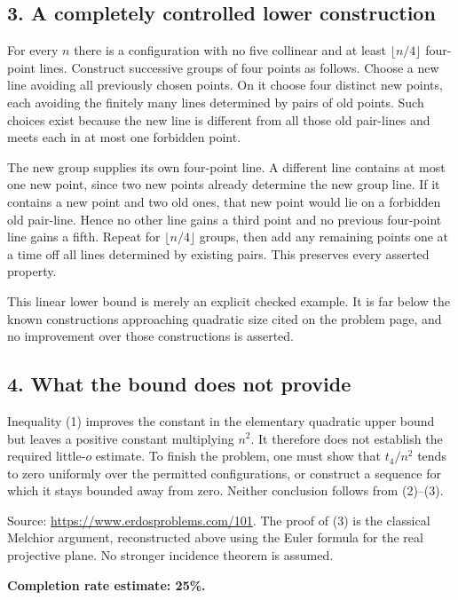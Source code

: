 \subsection*{3. A completely controlled lower construction}
For every $n$ there is a configuration with no five collinear and at least $\lfloor n/4\rfloor$ four-point lines. Construct successive groups of four points as follows. Choose a new line avoiding all previously chosen points. On it choose four distinct new points, each avoiding the finitely many lines determined by pairs of old points. Such choices exist because the new line is different from all those old pair-lines and meets each in at most one forbidden point.

The new group supplies its own four-point line. A different line contains at most one new point, since two new points already determine the new group line. If it contains a new point and two old ones, that new point would lie on a forbidden old pair-line. Hence no other line gains a third point and no previous four-point line gains a fifth. Repeat for $\lfloor n/4\rfloor$ groups, then add any remaining points one at a time off all lines determined by existing pairs. This preserves every asserted property.

This linear lower bound is merely an explicit checked example. It is far below the known constructions approaching quadratic size cited on the problem page, and no improvement over those constructions is asserted.

\subsection*{4. What the bound does not provide}
Inequality (1) improves the constant in the elementary quadratic upper bound but leaves a positive constant multiplying $n^2$. It therefore does not establish the required little-$o$ estimate. To finish the problem, one must show that $t_4/n^2$ tends to zero uniformly over the permitted configurations, or construct a sequence for which it stays bounded away from zero. Neither conclusion follows from (2)--(3).

Source: \url{https://www.erdosproblems.com/101}. The proof of (3) is the classical Melchior argument, reconstructed above using the Euler formula for the real projective plane. No stronger incidence theorem is assumed.

\textbf{Completion rate estimate: 25\%.}

